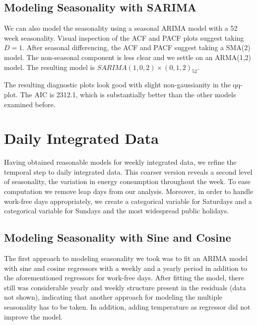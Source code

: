 \documentclass[conference]{IEEEtran}
\begin{document}
\subsection{Modeling Seasonality with SARIMA}
We can also model the seasonality using a seasonal ARIMA model with a 52 week seasonality. Visual inspection of the ACF and PACF plots suggest taking $D=1$. After seasonal differencing, the ACF and PACF suggest taking a SMA(2) model. The non-seasonal component is less clear and we settle on an ARMA(1,2) model. The resulting model is $SARIMA(1,0,2)\times(0,1,2)_{52}$. 
\par
The resulting diagnostic plots look good with slight non-gaussianity in the qq-plot. The AIC is 2312.1, which is substantially better than the other models examined before.



\section{Daily Integrated Data}
Having obtained reasonable models for weekly integrated data, we refine the temporal step to daily integrated data. This coarser version reveals a second level of seasonality, the variation in energy consumption throughout the week. To ease computation we remove leap days from our analysis. Moreover, in order to handle work-free days appropriately, we create a categorical variable for Saturdays and a categorical variable for Sundays and the most widespread public holidays. 

\subsection{Modeling Seasonality with Sine and Cosine}
The first approach to modeling seasonality we took was to fit an ARIMA model with sine and cosine regressors with a weekly and a yearly period in addition to the aforementioned regressors for work-free days. After fitting the model, there still was considerable yearly and weekly structure present in the residuals (data not shown), indicating that another approach for modeling the multiple seasonality has to be taken. In addition, adding temperature as regressor did not improve the model. 
\end{document}
